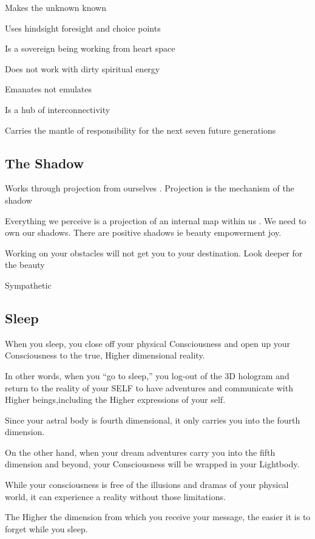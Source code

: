 Makes the unknown known

Uses hindsight foresight and choice points

Is a sovereign being working from heart space

Does not work with dirty spiritual energy

Emanates not emulates

Is a hub of interconnectivity

Carries the mantle of responsibility for the next seven future
generations

\subsection{The Shadow}\label{the-shadow}

Works through projection from ourselves . Projection is the mechanism of
the shadow

Everything we perceive is a projection of an internal map within us . We
need to own our shadows. There are positive shadows ie beauty
empowerment joy.

Working on your obstacles will not get you to your destination. Look
deeper for the beauty

Sympathetic

\subsection{Sleep}\label{sleep}

When you sleep, you close off your physical Consciousness and open up
your Consciousness to the true, Higher dimensional reality.

In other words, when you ``go to sleep,'' you log-out of the 3D hologram
and return to the reality of your SELF to have adventures and
communicate with Higher beings,including the Higher expressions of your
self.

Since your astral body is fourth dimensional, it only carries you into
the fourth dimension.

On the other hand, when your dream adventures carry you into the fifth
dimension and beyond, your Consciousness will be wrapped in your
Lightbody.

While your consciousness is free of the illusions and dramas of your
physical world, it can experience a reality without those limitations.

The Higher the dimension from which you receive your message, the easier
it is to forget while you sleep.

